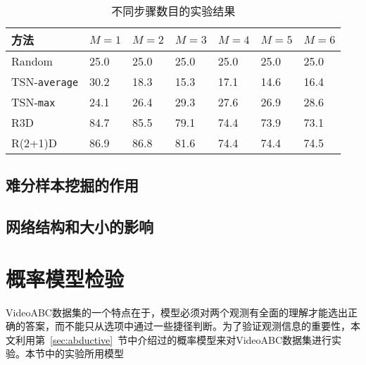 \begin{table}
    \caption{不同步骤数目的实验结果}
    \begin{tabu}to \\
        \toprule
            方法 & $M=1$ & $M=2$ & $M=3$ & $M=4$ & $M=5$ & $M=6$\\
            \midrule
        Random & 25.0 & 25.0 & 25.0 & 25.0 & 25.0 & 25.0\\
         \midrule
        TSN-\texttt{average} & 30.2 & 18.3 & 15.3 & 17.1 & 14.6 & 16.4 \\
        TSN-\texttt{max} & 24.1 & 26.4 & 29.3 & 27.6 & 26.9 & 28.6 \\
         \midrule
        R3D & 84.7 & 85.5 & 79.1 & 74.4 & 73.9 & 73.1 \\
        R(2+1)D & 86.9 & 86.8 & 81.6 & 74.4 & 74.4 & 74.5 \\
         \bottomrule
        \end{tabu}
\end{table}

\subsection{难分样本挖掘的作用}
\subsection{网络结构和大小的影响}
\section{概率模型检验}\label{sec:exp:prob}
VideoABC数据集的一个特点在于，模型必须对两个观测有全面的理解才能选出正确的答案，而不能只从选项中通过一些捷径判断。为了验证观测信息的重要性，本文利用第~\ref{sec:abductive}~节中介绍过的概率模型来对VideoABC数据集进行实验。本节中的实验所用模型
